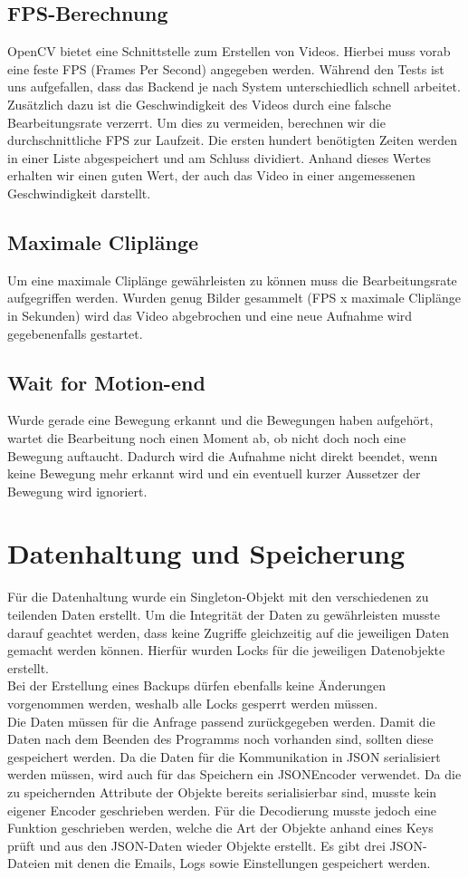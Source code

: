 \subsection{FPS-Berechnung}
OpenCV bietet eine Schnittstelle zum Erstellen von Videos. Hierbei muss vorab eine feste FPS (Frames Per Second) angegeben werden. Während den Tests ist uns aufgefallen, dass das Backend je nach System unterschiedlich schnell arbeitet. Zusätzlich dazu ist die Geschwindigkeit des Videos durch eine falsche Bearbeitungsrate verzerrt. Um dies zu vermeiden, berechnen wir die durchschnittliche FPS zur Laufzeit. Die ersten hundert benötigten Zeiten werden in einer Liste abgespeichert und am Schluss dividiert. Anhand dieses Wertes erhalten wir einen guten Wert, der auch das Video in einer angemessenen Geschwindigkeit darstellt.
\subsection{Maximale Cliplänge}
Um eine maximale Cliplänge gewährleisten zu können muss die Bearbeitungsrate aufgegriffen werden. Wurden genug Bilder gesammelt (FPS x maximale Cliplänge in Sekunden) wird das Video abgebrochen und eine neue Aufnahme wird gegebenenfalls gestartet.
\subsection{Wait for Motion-end}
Wurde gerade eine Bewegung erkannt und die Bewegungen haben aufgehört, wartet die Bearbeitung noch einen Moment ab, ob nicht doch noch eine Bewegung auftaucht. Dadurch wird die Aufnahme nicht direkt beendet, wenn keine Bewegung mehr erkannt wird und ein eventuell kurzer Aussetzer der Bewegung wird ignoriert.
\section{Datenhaltung und Speicherung}
Für die Datenhaltung wurde ein Singleton-Objekt mit den verschiedenen zu teilenden Daten erstellt. Um die Integrität der Daten zu gewährleisten musste darauf geachtet werden, dass keine Zugriffe gleichzeitig auf die jeweiligen Daten
gemacht werden können. Hierfür wurden Locks für die jeweiligen Datenobjekte erstellt.\\
Bei der Erstellung eines Backups dürfen ebenfalls keine Änderungen vorgenommen werden, weshalb alle Locks gesperrt werden müssen.\\
Die Daten müssen für die Anfrage passend zurückgegeben werden.
Damit die Daten nach dem Beenden des Programms noch vorhanden sind, sollten diese gespeichert werden. Da die Daten für die Kommunikation in JSON serialisiert werden müssen, wird auch für das Speichern ein JSONEncoder verwendet. Da die zu speichernden Attribute
der Objekte bereits serialisierbar sind, musste kein eigener Encoder geschrieben werden. Für die Decodierung musste jedoch eine Funktion geschrieben werden, welche die Art der Objekte anhand eines Keys prüft und aus den JSON-Daten wieder Objekte erstellt.
Es gibt drei JSON-Dateien mit denen die Emails, Logs sowie Einstellungen gespeichert werden.

